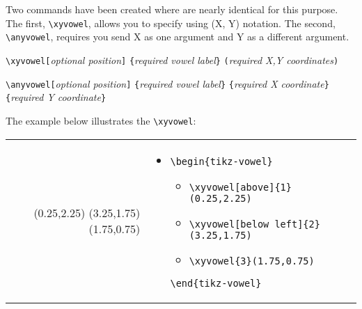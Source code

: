 \documentclass{article}
\def\\{}%
\def\charissil{}%
\begin{document}
Two commands have been created where are nearly identical for this purpose.  The first, \verb|\xyvowel|, allows you to specify using (X, Y) notation.  The second, \verb|\anyvowel|, requires you send X as one argument and Y as a different argument.

\medskip
\qquad \verb+\xyvowel[+\textit{optional position}\verb+]+\\
\qquad\hspace*{9em} \verb+{+\textit{required vowel label}\verb+}+\\
\qquad\hspace*{9em} \verb+(+\textit{required X,Y coordinates}\verb+)+
\bigskip


\qquad \verb+\anyvowel[+\textit{optional position}\verb+]+\\
\qquad\hspace*{9em} \verb+{+\textit{required vowel label}\verb+}+\\
\qquad\hspace*{9em} \verb+{+\textit{required X coordinate}\verb+}+\\
\qquad\hspace*{9em} \verb+{+\textit{required Y coordinate}\verb+}+
\bigskip

\noindent
The example below illustrates the \verb|\xyvowel|:

\begin{center}
\begin{tabular}{rl}
  \begin{minipage}[t]{0.35\textwidth}
	{\large\charissil
		{\bfseries
		\begin{tikz-vowel}
    			\xyvowel[above]{1}(0.25,2.25)
    			\xyvowel[below left]{2}(3.25,1.75)
   			\xyvowel{3}(1.75,0.75)
		\end{tikz-vowel}
		}
	}
  \end{minipage} &
  \begin{minipage}[t]{0.44\textwidth}
  \vspace{-90pt}
  {\small
\begin{itemize}[label={}]
	\item \verb|\begin{tikz-vowel}|
		\begin{itemize}[label={}]
			\item \verb|\xyvowel[above]{1}(0.25,2.25)|
			\item \verb|\xyvowel[below left]{2}(3.25,1.75)|
			\item \verb|\xyvowel{3}(1.75,0.75)|
		\end{itemize}
	\verb|\end{tikz-vowel}|
\end{itemize}
    }
  \end{minipage}
\end{tabular}
\end{center}
\end{document}
